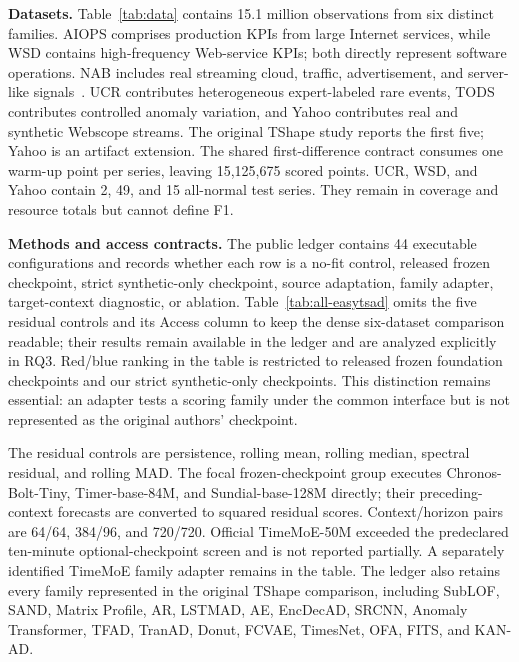 \textbf{Datasets.}
Table~\ref{tab:data} contains 15.1 million observations from six distinct families. AIOPS comprises production KPIs from large Internet services, while WSD contains high-frequency Web-service KPIs; both directly represent software operations. NAB includes real streaming cloud, traffic, advertisement, and server-like signals~\cite{ahmad2017nab}. UCR contributes heterogeneous expert-labeled rare events, TODS contributes controlled anomaly variation, and Yahoo contributes real and synthetic Webscope streams. The original TShape study reports the first five; Yahoo is an artifact extension. The shared first-difference contract consumes one warm-up point per series, leaving 15,125,675 scored points. UCR, WSD, and Yahoo contain 2, 49, and 15 all-normal test series. They remain in coverage and resource totals but cannot define F1.

\textbf{Methods and access contracts.}
The public ledger contains 44 executable configurations and records whether each row is a no-fit control, released frozen checkpoint, strict synthetic-only checkpoint, source adaptation, family adapter, target-context diagnostic, or ablation. Table~\ref{tab:all-easytsad} omits the five residual controls and its Access column to keep the dense six-dataset comparison readable; their results remain available in the ledger and are analyzed explicitly in RQ3. Red/blue ranking in the table is restricted to released frozen foundation checkpoints and our strict synthetic-only checkpoints. This distinction remains essential: an adapter tests a scoring family under the common interface but is not represented as the original authors' checkpoint.

The residual controls are persistence, rolling mean, rolling median, spectral residual, and rolling MAD. The focal frozen-checkpoint group executes Chronos-Bolt-Tiny, Timer-base-84M, and Sundial-base-128M directly; their preceding-context forecasts are converted to squared residual scores. Context/horizon pairs are 64/64, 384/96, and 720/720. Official TimeMoE-50M exceeded the predeclared ten-minute optional-checkpoint screen and is not reported partially. A separately identified TimeMoE family adapter remains in the table. The ledger also retains every family represented in the original TShape comparison, including SubLOF, SAND, Matrix Profile, AR, LSTMAD, AE, EncDecAD, SRCNN, Anomaly Transformer, TFAD, TranAD, Donut, FCVAE, TimesNet, OFA, FITS, and KAN-AD.

